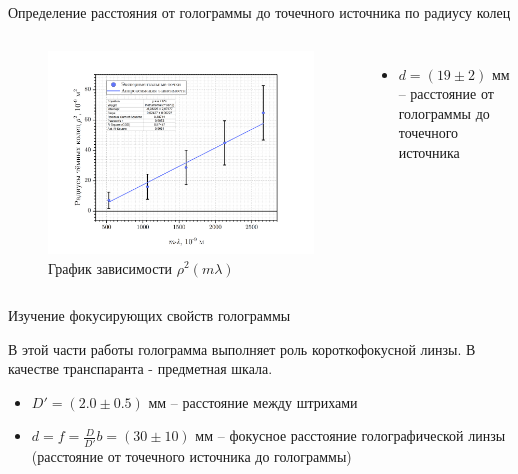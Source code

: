 \documentclass[11pt]{beamer} %
\begin{document}
    \begin{frame}{Определение расстояния от голограммы до точечного источника по радиусу колец}
    \small
        \begin{columns}
            \begin{figure}[H]
                \centering
                \includegraphics[width = \textwidth]{images/rm_graph.png}
                \caption{График зависимости $\rho^2(m \lambda)$}
            \end{figure}
        
            \begin{itemize}
               \item $d = \left( 19 \pm 2 \right) \text{ мм}$ -- расстояние от голограммы до точечного источника
            \end{itemize}
        
        \end{columns}
    \end{frame}

    \begin{frame}{Изучение фокусирующих свойств голограммы}
    \small

    В этой части работы голограмма выполняет роль короткофокусной линзы. В качестве транспаранта - предметная шкала.

    \begin{itemize}
        \item $D' = \left( 2.0 \pm 0.5 \right) \text{ мм}$ -- расстояние между штрихами
        \item $d = f = \frac{D}{D'} b = \left( 30 \pm 10 \right) \text{ мм}$ -- фокусное расстояние голографической линзы (расстояние от точечного источника до голограммы)
    \end{itemize}
       
    \end{frame}
\end{document}
